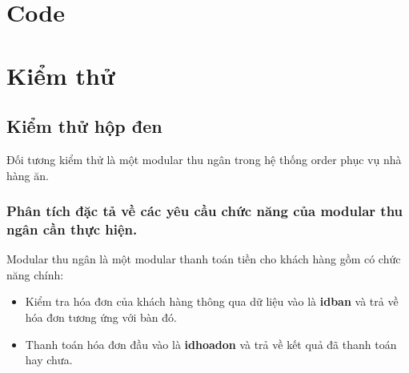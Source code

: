\documentclass[a4paper,12pt]{report}
\begin{document}
\chapter{Code}
\chapter{Kiểm thử}
\section{Kiểm thử hộp đen}
Đối tương kiểm thử là một modular thu ngân trong hệ thống order phục vụ nhà hàng ăn.
\subsection{Phân tích đặc tả về các yêu cầu chức năng của modular thu ngân cần thực hiện.}
Modular thu ngân là một modular thanh toán tiền cho khách hàng gồm có chức năng chính:
\begin{itemize}
\item Kiểm tra hóa đơn của khách hàng thông qua dữ liệu vào là \textbf{idban} và trả về hóa đơn tương ứng với bàn đó.
\item Thanh toán hóa đơn đầu vào là \textbf{idhoadon} và trả về kết quả đã thanh toán hay chưa.
\end{itemize}
\end{document}

